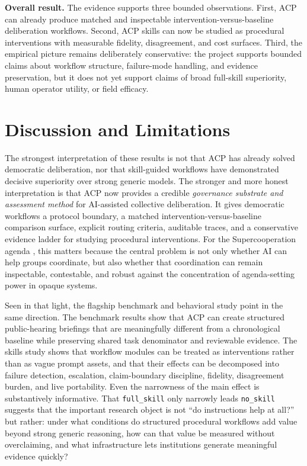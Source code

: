 \documentclass[11pt]{article}
\begin{document}
\vspace{0.1in}
\textbf{Overall result.} The evidence supports three bounded observations. First, ACP can already produce matched and inspectable intervention-versus-baseline deliberation workflows. Second, ACP skills can now be studied as procedural interventions with measurable fidelity, disagreement, and cost surfaces. Third, the empirical picture remains deliberately conservative: the project supports bounded claims about workflow structure, failure-mode handling, and evidence preservation, but it does not yet support claims of broad full-skill superiority, human operator utility, or field efficacy.

\section{Discussion and Limitations}

The strongest interpretation of these results is not that ACP has already solved democratic deliberation, nor that skill-guided workflows have demonstrated decisive superiority over strong generic models. The stronger and more honest interpretation is that ACP now provides a credible \emph{governance substrate and assessment method} for AI-assisted collective deliberation. It gives democratic workflows a protocol boundary, a matched intervention-versus-baseline comparison surface, explicit routing criteria, auditable traces, and a conservative evidence ladder for studying procedural interventions. For the Supercooperation agenda \cite{Foresight2026Supercooperation}, this matters because the central problem is not only whether AI can help groups coordinate, but also whether that coordination can remain inspectable, contestable, and robust against the concentration of agenda-setting power in opaque systems.

\vspace{0.1in}
Seen in that light, the flagship benchmark and behavioral study point in the same direction. The benchmark results show that ACP can create structured public-hearing briefings that are meaningfully different from a chronological baseline while preserving shared task denominator and reviewable evidence. The skills study shows that workflow modules can be treated as interventions rather than as vague prompt assets, and that their effects can be decomposed into failure detection, escalation, claim-boundary discipline, fidelity, disagreement burden, and live portability. Even the narrowness of the main effect is substantively informative. That \texttt{full\_skill} only narrowly leads \texttt{no\_skill} suggests that the important research object is not ``do instructions help at all?'' but rather: under what conditions do structured procedural workflows add value beyond strong generic reasoning, how can that value be measured without overclaiming, and what infrastructure lets institutions generate meaningful evidence quickly?
\end{document}
